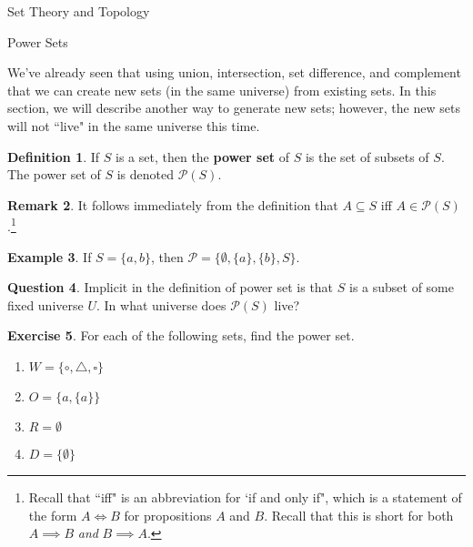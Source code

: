 \documentclass[11pt]{article}
\theoremstyle{definition}
\newtheorem{theorem}{Theorem}[section]
\newtheorem{definition}[theorem]{Definition}
\newtheorem{example}[theorem]{Example}
\newtheorem{exercise}[theorem]{Exercise}
\newtheorem{remark}[theorem]{Remark}
\newtheorem{question}[theorem]{Question}
\begin{document}
\addtocounter{section}{1}

\begin{section}{Set Theory and Topology}

\addtocounter{subsection}{1}
\addtocounter{theorem}{27}

\begin{subsection}{Power Sets}

We've already seen that using union, intersection, set difference, and complement that we can create new sets (in the same universe) from existing sets.  In this section, we will describe another way to generate new sets; however, the new sets will not ``live" in the same universe this time.

\begin{definition}
If $S$ is a set, then the \textbf{power set} of $S$ is the set of subsets of $S$.  The power set of $S$ is denoted $\mathcal{P}(S)$.
\end{definition}

\begin{remark}
It follows immediately from the definition that $A\subseteq S$ iff $A\in\mathcal{P}(S)$.\footnote{Recall that ``iff" is an abbreviation for `if and only if", which is a statement of the form $A\iff B$ for propositions $A$ and $B$.  Recall that this is short for both $A\implies B$ \emph{and} $B\implies A$.}
\end{remark}

\begin{example}
If $S=\{a,b\}$, then $\mathcal{P}=\{\emptyset, \{a\}, \{b\}, S\}$.
\end{example}

\begin{question}
Implicit in the definition of power set is that $S$ is a subset of some fixed universe $U$.  In what universe does $\mathcal{P}(S)$ live?
\end{question}

\begin{exercise}
For each of the following sets, find the power set.
\begin{enumerate}
\item $W=\{\circ, \triangle, \square\}$
\item $O=\{a,\{a\}\}$
\item $R=\emptyset$
\item $D=\{\emptyset\}$
\end{enumerate}
\end{exercise}



\end{subsection}
\end{section}
\end{document}
